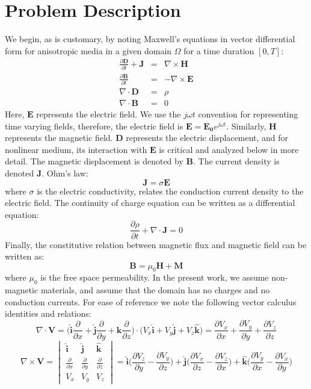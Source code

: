 \documentclass{article}[12pt]
\theoremstyle{plain}
\begin{document}
\section{Problem Description}
\label{section:problem_description}
We begin, as is customary, by noting Maxwell's equations in vector differential form for anisotropic media
in a given domain $\Omega$ for a time duration $[0,T]$:
\begin{eqnarray}
\frac{\partial \mathbf{D}}{\partial t} + \mathbf{J} & = & \nabla \times \mathbf{H} \label{eqn:mx1}\\
\frac{\partial \mathbf{B}}{\partial t} & = & - \nabla \times \mathbf{E} \label{eqn:mx2}\\
\nabla \cdot \mathbf{D} & = & \rho \label{eqn:mx3}\\
\nabla \cdot \mathbf{B} & = & 0 \label{eqn:mx4} 
\end{eqnarray}
Here, $\mathbf{E}$ represents the electric field. We use the $j\omega t$ convention for
representing time varying fields, therefore, the electric field is $\mathbf{E}=\mathbf{E_0}e^{j\omega t}$.
Similarly, $\mathbf{H}$ represents the magnetic field. $\mathbf{D}$ represents the electric
displacement, and for nonlinear medium, its interaction with $\mathbf{E}$ is critical and analyzed
below in more detail. The magnetic displacement is denoted by $\mathbf{B}$. The current density
is denoted $\mathbf{J}$. Ohm's law:
\[
\mathbf{J} = \sigma \mathbf{E}
\]
where $\sigma$ is the electric conductivity, relates the conduction current density to the electric
field. The continuity of charge equation can be written as a differential equation:
\[
\frac{\partial \rho}{\partial t} + \nabla \cdot \mathbf{J} = 0
\]
Finally, the constitutive relation between magnetic flux and magnetic field can be written as:
\[
\mathbf{B} = \mu_0 \mathbf{H} + \mathbf{M}
\]
where $\mu_0$ is the free space permeability.
In the present work, we assume non-magnetic materials, and assume that the domain has no charges and
no conduction currents.
For ease of reference we note the following vector calculus identities and relations:
\begin{equation}
\nabla \cdot \mathbf{V} = \Big( \hat{\mathbf{i}} \frac{\partial}{\partial x}
+ \hat{\mathbf{j}} \frac{\partial}{\partial y}
+ \hat{\mathbf{k}} \frac{\partial}{\partial z} \Big) \cdot
\Big( V_x\hat{\mathbf{i}} + V_y\hat{\mathbf{j}} + V_z\hat{\mathbf{k}}\Big) =
\frac{\partial V_x}{\partial x} + 
\frac{\partial V_y}{\partial y} + 
\frac{\partial V_z}{\partial z} 
\end{equation}
\begin{equation}
\nabla \times \mathbf{V} = \begin{vmatrix}
\hat{\mathbf{i}} & \hat{\mathbf{j}} & \hat{\mathbf{k}} \\
\frac{\partial}{\partial x} & \frac{\partial}{\partial y} & \frac{\partial}{\partial z} \\
V_x & V_y & V_z
\end{vmatrix}
= \hat{\mathbf{i}}\Big( \frac{\partial V_z}{\partial y} - \frac{\partial V_y}{\partial z}\Big)
+ \hat{\mathbf{j}}\Big( \frac{\partial V_x}{\partial z} - \frac{\partial V_z}{\partial x}\Big)
+ \hat{\mathbf{k}}\Big( \frac{\partial V_y}{\partial x} - \frac{\partial V_x}{\partial y}\Big)
\end{equation}
\end{document}

